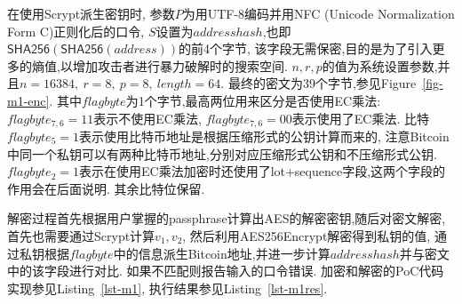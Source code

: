 在使用Scrypt派生密钥时, 参数$P$为用UTF-8编码并用NFC (Unicode Normalization Form C)正则化后的口令,
$S$设置为$addresshash$,也即$ \textsf{SHA256}(\textsf{SHA256}(address))$的前4个字节, 
该字段无需保密,目的是为了引入更多的熵值,以增加攻击者进行暴力破解时的搜索空间.
$n, r, p$的值为系统设置参数,并且$n=16384,\ r=8,\ p=8,\ length=64$.
最终的密文为39个字节,参见Figure~\ref{fig-m1-enc}.
其中$flagbyte$为1个字节,最高两位用来区分是否使用EC乘法:
$flagbyte_{7,6}=11$表示不使用EC乘法,
$flagbyte_{7,6}=00$表示使用了EC乘法.
比特$flagbyte_{5}=1$表示使用比特币地址是根据压缩形式的公钥计算而来的,
注意Bitcoin中同一个私钥可以有两种比特币地址,分别对应压缩形式公钥和不压缩形式公钥.
$flagbyte_{2}=1$表示在使用EC乘法加密时还使用了lot+sequence字段,这两个字段的作用会在后面说明.
其余比特位保留.


解密过程首先根据用户掌握的passphrase计算出AES的解密密钥,随后对密文解密,
首先也需要通过Scrypt计算$v_1, v_2$, 然后利用\textsf{AES256Encrypt}解密得到私钥的值,
通过私钥根据$flagbyte$中的信息派生Bitcoin地址,并进一步计算$addresshash$并与密文中的该字段进行对比.
如果不匹配则报告输入的口令错误. 加密和解密的PoC代码实现参见Listing~\ref{lst-m1},
执行结果参见Listing~\ref{lst-m1res}.


